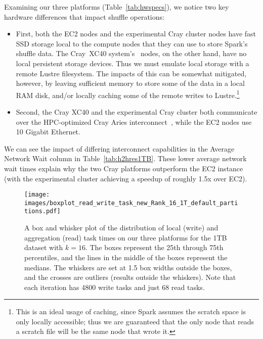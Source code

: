 Examining our three platforms (Table~\ref{tab:hwspecs}), we notice two key hardware differences that impact shuffle operations:
\begin{itemize}
\item First, both the EC2 nodes and the experimental Cray cluster nodes have fast SSD storage local to the compute nodes that they can use to store Spark's shuffle data.  
  The Cray{\textsuperscript{\tiny\textregistered}}~XC40{\textsuperscript{\tiny\texttrademark}} system's~\cite{alverson2012cray,craycascadesc12} nodes, on the other hand, have no local persistent storage devices.  Thus we must emulate local storage with a remote Lustre filesystem.  The impacts of this can be somewhat mitigated, however, by leaving sufficient memory to store some of the data in a local RAM disk, and/or locally caching some of the remote writes to Lustre.\footnote{This is an ideal usage of caching, since Spark assumes the scratch space is only locally accessible; thus we are guaranteed that the only node that reads a scratch file will be the same node that wrote it.}
\item Second, the Cray XC40 and the experimental Cray cluster both communicate over the HPC-optimized Cray Aries 
interconnect~\cite{alverson2012cray,craycascadesc12}, while the EC2 nodes use 10 Gigabit Ethernet.
\end{itemize}  
We can see the impact of differing interconnect capabilities in the Average Network Wait column in Table~\ref{tab:h2hres1TB}.   These lower average network wait times explain why the two Cray platforms outperform the EC2 instance (with the experimental cluster achieving a speedup of roughly 1.5x over EC2).  

   \begin{figure}
    \begin{centering}
    \texttt{[image: images/boxplot\_read\_write\_task\_new\_Rank\_16\_1T\_default\_partitions.pdf]}
    \end{centering}
    \caption{A box and whisker plot of the distribution of local (write) and aggregation (read) task times on our three platforms for the 1TB dataset with $k=16$.  The boxes represent the 25th through 75th percentiles, and the lines in the middle of the boxes represent the medians.  The whiskers are set at 1.5 box widths outside the boxes, and the crosses are outliers (results outside the whiskers).  Note that each iteration has 4800 write tasks and just 68 read tasks.}
    \label{fig:rwtaskdist} 
    \end{figure}

